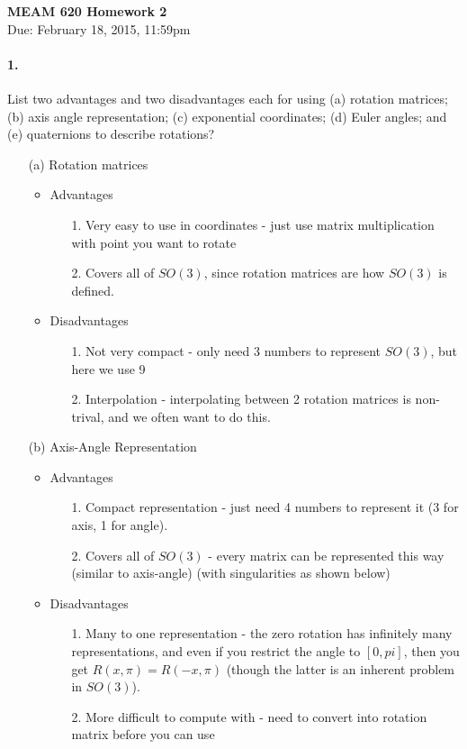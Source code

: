 \documentclass[english]{article}
\begin{document}
	
\begin{center}
{\textbf{MEAM 620 Homework 2}} \\
Due: February 18, 2015, 11:59pm
\end{center}


\paragraph{1.} List two advantages and two disadvantages each for using (a) rotation matrices;(b) axis angle representation; (c) exponential coordinates; (d) Euler angles; and (e) quaternions to describe rotations? 
\[\textrm{ }\]
\begin{enumerate}
 \item[(a)] Rotation matrices 
    \begin{itemize}
     \item Advantages
     \begin{enumerate}
      \item[1.] Very easy to use in coordinates - just use matrix multiplication with point you want to rotate
      \item[2.] Covers all of $SO(3)$, since rotation matrices are how $SO(3)$ is defined. 
     \end{enumerate}
     \item Disadvantages
     \begin{enumerate}
      \item[1.] Not very compact - only need 3 numbers to represent $SO(3)$, but here we use 9
      \item[2.] Interpolation - interpolating between 2 rotation matrices is non-trival, and we often want to do this.
     \end{enumerate}
    \end{itemize}

 \item[(b)] Axis-Angle Representation 
    \begin{itemize}
     \item Advantages
     \begin{enumerate}
      \item[1.] Compact representation - just need 4 numbers to represent it (3 for axis, 1 for angle). 
      \item[2.] Covers all of $SO(3)$ - every matrix can be represented this way (similar to axis-angle) (with singularities as shown below)
     \end{enumerate}
     \item Disadvantages
     \begin{enumerate}
      \item[1.] Many to one representation - the zero rotation has infinitely many representations,
                and even if you restrict the angle to $[0,pi]$, then you get $R(x,\pi) = R(-x,\pi)$
                (though the latter is an inherent problem in $SO(3)$). 
      \item[2.] More difficult to compute with - need to convert into rotation matrix before you can use
     \end{enumerate}
    \end{itemize}


\end{enumerate}
\end{document}
